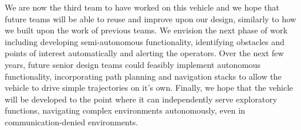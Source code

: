 We are now the third team to have worked on this vehicle and we hope that future teams will be able to reuse and improve upon our design, similarly to how we built upon the work of previous teams. We envision the next phase of work including developing semi-autonomous functionality, identifying obstacles and points of interest automatically and alerting the operators. Over the next few years, future senior design teams could feasibly implement autonomous functionality, incorporating path planning and navigation stacks to allow the vehicle to drive simple trajectories on it's own. Finally, we hope that the vehicle will be developed to the point where it can independently serve exploratory functions, navigating complex environments autonomously, even in communication-denied environments.


